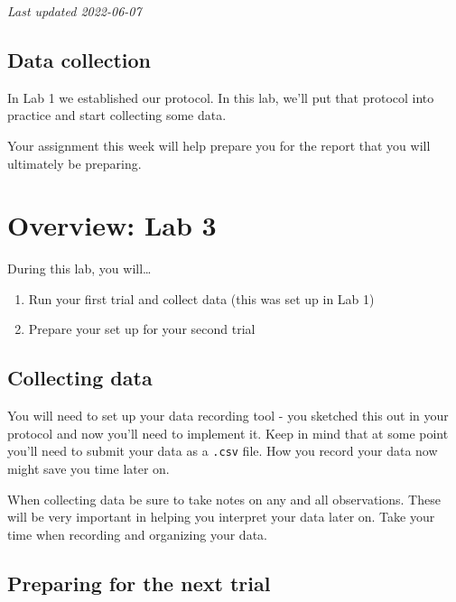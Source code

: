 \documentclass[
]{book}
\providecommand{\tightlist}{%
  \setlength{\itemsep}{0pt}\setlength{\parskip}{0pt}}
\begin{document}
\emph{Last updated 2022-06-07}

\hypertarget{data-collection}{%
\subsection*{Data collection}\label{data-collection}}

In Lab 1 we established our protocol. In this lab, we'll put that protocol into practice and start collecting some data.

Your assignment this week will help prepare you for the report that you will ultimately be preparing.

\hypertarget{overview-lab-3}{%
\section*{Overview: Lab 3}\label{overview-lab-3}}

During this lab, you will\ldots{}

\begin{enumerate}
\def\labelenumi{\arabic{enumi}.}
\tightlist
\item
  Run your first trial and collect data (this was set up in Lab 1)
\item
  Prepare your set up for your second trial
\end{enumerate}

\hypertarget{collecting-data}{%
\subsection*{Collecting data}\label{collecting-data}}

You will need to set up your data recording tool - you sketched this out in your protocol and now you'll need to implement it. Keep in mind that at some point you'll need to submit your data as a \texttt{.csv} file. How you record your data now might save you time later on.

When collecting data be sure to take notes on any and all observations. These will be very important in helping you interpret your data later on. Take your time when recording and organizing your data.

\hypertarget{preparing-for-the-next-trial}{%
\subsection*{Preparing for the next trial}\label{preparing-for-the-next-trial}}
\end{document}
